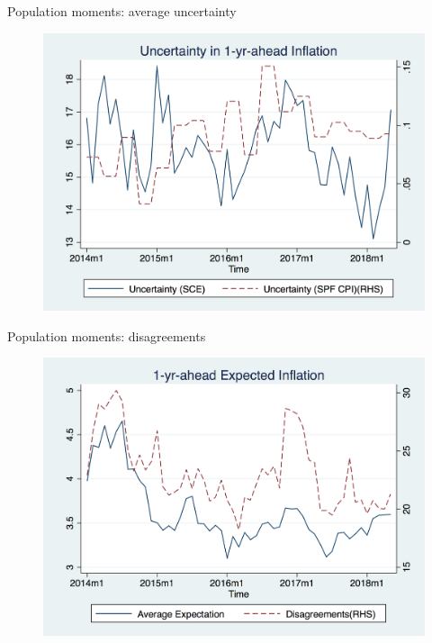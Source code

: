 \documentclass{beamer}
\begin{document}
\begin{frame}{Population moments: average uncertainty}
\begin{figure}
	\includegraphics[scale=0.3]{figures/var_var.png} 
\end{figure}
\end{frame}


\begin{frame}{Population moments: disagreements}
\begin{figure}
	\includegraphics[scale=0.3]{figures/mean_disg.png} 
\end{figure}
\end{frame}
\end{document}
